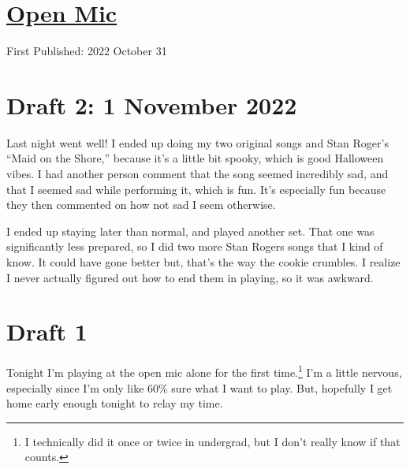 \documentclass[12pt]{article}[titlepage]
\newcommand{\say}[1]{``#1''}
\newcommand{\1}{\={a}}
\newcommand{\2}{\={e}}
\newcommand{\3}{\={\i}}
\newcommand{\4}{\=o}
\newcommand{\5}{\=u}
\newcommand{\6}{\={A}}
\renewcommand{\,}{\textsuperscript{,}}
\begin{document}
\doublespacing
\section{\href{open-mic-3.html}{Open Mic}}
First Published: 2022 October 31

\section{Draft 2: 1 November 2022}
Last night went well!
I ended up doing my two original songs and Stan Roger's \say{Maid on the Shore,} because it's a little bit spooky, which is good Halloween vibes.
I had another person comment that the song seemed incredibly sad, and that I seemed sad while performing it, which is fun.
It's especially fun because they then commented on how not sad I seem otherwise.

I ended up staying later than normal, and played another set.
That one was significantly less prepared, so I did two more Stan Rogers songs that I kind of know.
It could have gone better but, that's the way the cookie crumbles.
I realize I never actually figured out how to end them in playing, so it was awkward.

\section{Draft 1}
Tonight I'm playing at the open mic alone for the first time.\footnote{I technically did it once or twice in undergrad, but I don't really know if that counts.}
I'm a little nervous, especially since I'm only like 60\% sure what I want to play.
But, hopefully I get home early enough tonight to relay my time.
\end{document}
